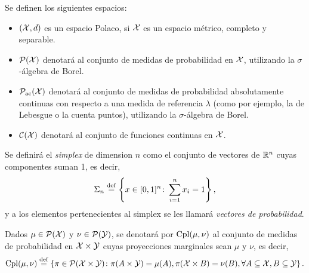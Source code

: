  {
  \begin{definition}
      Se definen los siguientes espacios:
      \begin{itemize}
          \item $(\cX, d)$ es un espacio Polaco, si $\cX$ es un espacio métrico, completo y separable.
          \item $\ProbSpace[\cX]$ denotará al conjunto de medidas de probabilidad en $\cX$, utilizando la $\sigma$-álgebra de Borel.
          \item $\ProbSpaceAC[\cX]$ denotará al conjunto de medidas de probabilidad absolutamente continuas con respecto a una medida de referencia $\lambda$ (como por ejemplo, la de Lebesgue o la cuenta puntos), utilizando la $\sigma$-álgebra de Borel.
          \item $\mathcal{C}(\cX)$ denotará al conjunto de funciones continuas en $\cX$.
      \end{itemize}
  \end{definition}

  \begin{definition}
      Se definirá el \emph{simplex} de dimension $n$ como el conjunto de vectores de $\R^{n}$ cuyas componentes suman 1, es decir,
      \begin{equation}
          \Simplex \eqdef \left\{
          x \in [0, 1]^{n} \colon \sum_{i=1}^{n} x_{i} = 1
          \right\},
      \end{equation}
      y a los elementos pertenecientes al simplex se les llamará \emph{vectores de probabilidad}.
  \end{definition}



  \begin{definition}
      Dados $\mu \in \ProbSpace[\cX]$ y $\nu \in \ProbSpace[\cY]$, se denotará por $\Cpl(\mu, \nu)$ al conjunto de medidas de probabilidad en $\cX \times \cY$ cuyas proyecciones marginales sean $\mu$ y $\nu$, es decir,
      \begin{equation}
          \Cpl(\mu, \nu) \eqdef \left\{
          \pi \in \ProbSpace[\cX \times \cY] \colon \pi(A \times \cY) = \mu(A), \pi(\cX \times B) = \nu(B), \forall A \subseteq \cX, B \subseteq \cY
          \right\}.
      \end{equation}
  \end{definition}

}
